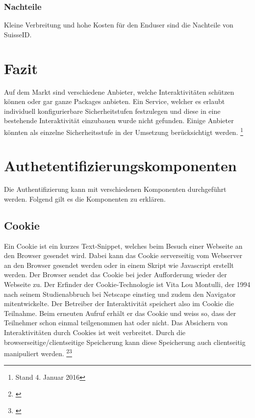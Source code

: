 \subsubsection{Nachteile}\label{nachteile-3}

Kleine Verbreitung und hohe Kosten für den Enduser sind die Nachteile
von SuisseID.

\section{Fazit}\label{fazit}

Auf dem Markt sind verschiedene Anbieter, welche Interaktivitäten
schützen können oder gar ganze Packages anbieten. Ein Service, welcher
es erlaubt individuell konfigurierbare Sicherheitstufen festzulegen und
diese in eine bestehende Interaktivität einzubauen wurde nicht gefunden.
Einige Anbieter könnten als einzelne Sicherheitsstufe in der Umsetzung
berücksichtigt werden. \footnote{Stand 4. Januar 2016}

\section{Authetentifizierungskomponenten}\label{authetentifizierungskomponenten}

Die Authentifizierung kann mit verschiedenen Komponenten durchgeführt
werden. Folgend gilt es die Komponenten zu erklären.

\subsection{Cookie}\label{cookie}

Ein Cookie ist ein kurzes Text-Snippet, welches beim Besuch einer
Webseite an den Browser gesendet wird. Dabei kann das Cookie
serverseitig vom Webserver an den Browser gesendet werden oder in einem
Skript wie Javascript erstellt werden. Der Browser sendet das Cookie bei
jeder Aufforderung wieder der Webseite zu. Der Erfinder der
Cookie-Technologie ist Vita Lou Montulli, der 1994 nach seinem
Studienabbruch bei Netscape einstieg und zudem den Navigator
mitentwickelte. Der Betreiber der Interaktivität speichert also im
Cookie die Teilnahme. Beim erneuten Aufruf erhält er das Cookie und
weiss so, dass der Teilnehmer schon einmal teilgenommen hat oder nicht.
Das Absichern von Interaktivitäten durch Cookies ist weit verbreitet.
Durch die browserseitige/clientseitige Speicherung kann diese
Speicherung auch clientseitig manipuliert werden. \footnote{\autocite{cookie-centra}}\footnote{\autocite{google-cookies}}

